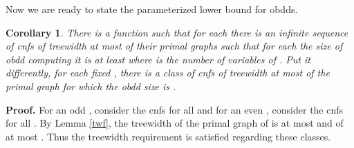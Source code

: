 \documentclass{article}
\newtheorem{corollary}{Corollary}
\begin{document}
\begin{comment}
Let us reformulate the statement of Theorem \ref{maintheor} in terms of the number
of variables of  and the treewidth of its primal graph, having in mind the bounds
on the treewidth as in Lemma \ref{twf}.

First of all, taking into account that , where  is the treewidth of the primal graph of ,
the lower bound can be seen as . Next, let  be the number of variables of .
Then, it is not hard to observe that .
Replacing  this way in , we obtain 
 as a lower bound on the 
{\sc obdd} size for . Clearly, if we consider  as a constant, this lower bound can be seen
as . 
\end{comment}

\begin{comment}
Let
 be the number of nodes of . Taking into account that , 
. Further on, according to Lemma \ref{twf}, 
where  is the treewidth of the primal graph of . Hence the lower bound
can be replaced by . Finally  where  is the number of 
variables. It is not hard to see that for a sufficiently big  compared to  (causing a sufficiently big 
) the bound  can be rewritten as .
Theorem \ref{maintheor} requires  to be even. However, for an odd ,
the theorem implies an obvious bound of ,
where  can be included into  starting from a sufficiently large . 

In order to prove the main result of the paper we need to look at the above statement
from a little bit different angle of finding a lower bound for the \emph{given} fixed treewidth .
If  is odd just take  and the above reasoning directly applies.
Otherwise, take  and in the resulting formula replace  by  which would cost 
a factor that can be included into  denominator. 
\end{comment}

Now we are ready to state the parameterized lower bound for {\sc obdd}s. 

\begin{corollary} \label{paramlower}
There is a function  such that for each 
there is an infinite sequence of {\sc cnf}s  of treewidth at most 
of their primal graphs 
such that for each  the size of {\sc obdd} 
computing it is at least  where  is the number of variables of . 
Put it differently, for each fixed , there is a class of {\sc cnf}s
of treewidth at most  of the primal graph for which the {\sc obdd} size is . 
\end{corollary}

{\bf Proof.}
For an odd , consider the {\sc cnf}s  for all 
and for an even , consider the {\sc cnf}s  for all .
By Lemma \ref{twf}, the treewidth of the primal graph of  is at 
most  and of  at most . Thus the treewidth requirement is
satisfied regarding these classes. 
\end{document}
